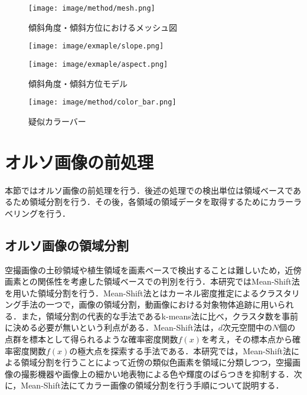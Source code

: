       \begin{figure}[t]
        \centering
        \texttt{[image: image/method/mesh.png]}
        \caption{傾斜角度・傾斜方位におけるメッシュ図}
        \label{メッシュ図}
      \end{figure}
      
      \begin{figure}[t]
        \begin{minipage}[c]{0.45\hsize}
          \centering
          \texttt{[image: image/exmaple/slope.png]}
        \end{minipage}
        \begin{minipage}[c]{0.45\hsize}
          \centering
          \texttt{[image: image/exmaple/aspect.png]}
        \end{minipage}
        \caption{傾斜角度・傾斜方位モデル}
        \label{傾斜角度・傾斜方位モデル}
      \end{figure}

      \begin{figure}[t]
        \centering
        \texttt{[image: image/method/color\_bar.png]}
        \caption{疑似カラーバー}
        \label{疑似カラーバー}
      \end{figure}


  \section{オルソ画像の前処理}
    本節ではオルソ画像の前処理を行う．後述の処理での検出単位は領域ベースであるため領域分割を行う．その後，各領域の領域データを取得するためにカラーラベリングを行う．


    \subsection{オルソ画像の領域分割}
      \label{オルソ画像の領域分割}
      空撮画像の土砂領域や植生領域を画素ベースで検出することは難しいため，近傍画素との関係性を考慮した領域ベースでの判別を行う．本研究ではMean-Shift法\cite{Mean-Shift法1, Mean-Shift法2}を用いた領域分割を行う．Mean-Shift法とはカーネル密度推定によるクラスタリング手法の一つで，画像の領域分割，動画像における対象物体追跡に用いられる．また，領域分割の代表的な手法であるk-means法\cite{k-means法}に比べ，クラスタ数を事前に決める必要が無いという利点がある．Mean-Shift法は，$d$次元空間中の$N$個の点群を標本として得られるような確率密度関数$f(x)$を考え，その標本点から確率密度関数$f(x)$の極大点を探索する手法である．本研究では，Mean-Shift法による領域分割を行うことによって近傍の類似色画素を領域に分類しつつ，空撮画像の撮影機器や画像上の細かい地表物による色や輝度のばらつきを抑制する．次に，Mean-Shift法にてカラー画像の領域分割を行う手順について説明する．

